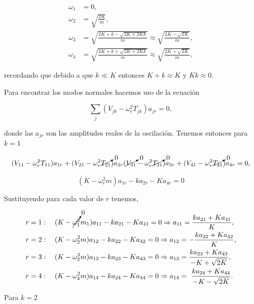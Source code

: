 \documentclass[a4paper,10pt]{article}
\numberwithin{equation}{section}
\begin{document}
\begin{align}
 \omega_1 &= 0, \\
 \omega_2 &= \sqrt{\frac{2K}{m}}, \\
 \omega_3 &= \sqrt{\frac{2K+k-\sqrt{2K+2Kk}}{m}} \approx 
 \sqrt{\frac{2K-\sqrt{2K}}{m}}, \\
 \omega_4 &=  \sqrt{\frac{2K+k+\sqrt{2K+2Kk}}{m}} \approx 
 \sqrt{\frac{2K+\sqrt{2K}}{m}},
\end{align}

recordando que debido a que $k\ll K$ entonces $K+k \approx K$ y $Kk \approx 0$.

\vspace{.3cm}

Para encontrar los modos normales hacemos uso de la ecuación

\begin{equation}
 \sum_j (V_{jk} - \omega^2_r T_{jk})a_{jr} = 0,
\end{equation}

donde las $a_{jr}$ son las amplitudes reales de la oscilación. Tenemos entonces 
para $k = 1$ 

\begin{equation}
 (V_{11} - \omega_r^2 T_{11})a_{1r} + (V_{21} - \omega_r^2 \cancelto{0}{T_{21}})a_{2r} 
 (\cancelto{0}{V_{31}} - \omega_r^2 \cancelto{0}{T_{31}})a_{3r} +
 (V_{41} - \omega_r^2 \cancelto{0}{T_{41}})a_{4r} = 0,
\end{equation}

\begin{equation}
 (K - \omega_r^2m)a_{1r} - ka_{2r} -Ka_{4r} = 0
\end{equation}

Sustituyendo para cada valor de $r$ tenemos,

\begin{align*}
 r &= 1: \quad  (K - \cancelto{0}{\omega_1^2}m_1)a_{11} - ka_{21} - Ka_{41}= 0 \Rightarrow
 a_{11}= \frac{ka_{21} + Ka_{41}}{K}, \\
 r &= 2: \quad (K - \omega_2^2m)a_{12} - ka_{22} - Ka_{42} = 0 \Rightarrow
 a_{12} = - \frac{ka_{22} + Ka_{42}}{K}, \\
 r &= 3: \quad (K - \omega_3^2m)a_{13} - ka_{23} - Ka_{43} = 0 \Rightarrow
 a_{13} = \frac{ka_{23} + Ka_{43}}{-K + \sqrt{2K}}, \\
 r &= 4: \quad (K - \omega_4^2m)a_{14} - ka_{24} - Ka_{44} = 0 \Rightarrow  
 a_{14} = \ \frac{ka_{24} + Ka_{44}}{-K - \sqrt{2K}}.
 \end{align*}
 
Para $k = 2$ 
\end{document}
